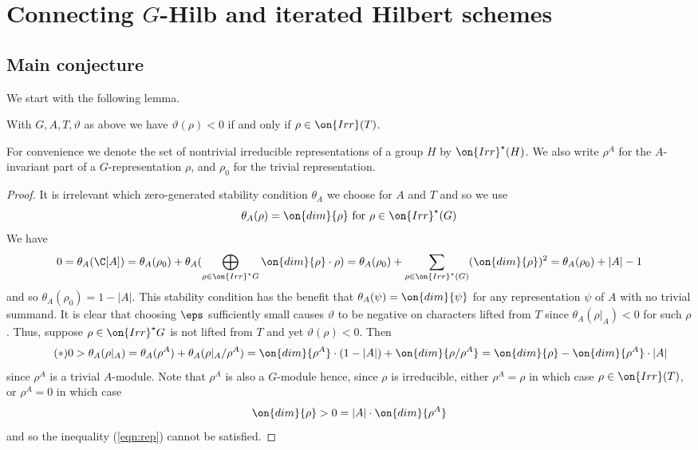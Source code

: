 \documentclass[leqno,11pt,a4paper]{amsart}
\begin{document}
\section{Connecting $G$-Hilb and iterated Hilbert schemes}

\subsection{Main conjecture} \label{sec:conj}

We start with the following lemma.

\begin{lemma} \label{lem:rep} With $G,A,T,\vartheta$ as above we have $\vartheta(\rho)<0$ if and only if $\rho\in\on{Irr}(T)$.
\end{lemma}

For convenience we denote the set of nontrivial irreducible representations of a group $H$ by $\on{Irr}^\star(H)$. We also write $\rho^A$ for the $A$-invariant part of a $G$-representation $\rho$, and $\rho_0$ for the trivial representation.

\begin{proof} It is irrelevant which zero-generated stability condition $\theta_A$ we choose for $A$ and $T$ and so we use
$$\theta_A(\rho)=\on{dim}{\rho}\text{ for $\rho\in\on{Irr}^\star(G)$}$$
We have
$$0=\theta_A(\C[A])=\theta_A(\rho_0)+\theta_A(\bigoplus_{\rho\in\on{Irr}^\star{G}}\on{dim}{\rho}\cdot\rho)=\theta_A(\rho_0)+\sum_{\rho\in\on{Irr}^\star(G)}(\on{dim}{\rho})^2=\theta_A(\rho_0)+|A|-1$$
and so $\theta_A(\rho_0)=1-|A|$. This stability condition has the benefit that $\theta_A(\psi)=\on{dim}{\psi}$ for any representation $\psi$ of $A$ with no trivial summand. It is clear that choosing $\eps$ sufficiently small causes $\vartheta$ to be negative on characters lifted from $T$ since $\theta_A(\rho|_A)<0$ for such $\rho$. Thus, suppose $\rho\in\on{Irr}^\star{G}$ is not lifted from $T$ and yet $\vartheta(\rho)<0$. Then
\begin{equation} \label{eqn:rep} \tag{$*$}
0>\theta_A(\rho|_A)=\theta_A(\rho^A)+\theta_A(\rho|_A/\rho^A)=\on{dim}{\rho^A}\cdot(1-|A|)+\on{dim}{\rho/\rho^A}=\on{dim}{\rho}-\on{dim}{\rho^A}\cdot |A|
\end{equation}
since $\rho^A$ is a trivial $A$-module. Note that $\rho^A$ is also a $G$-module hence, since $\rho$ is irreducible, either $\rho^A=\rho$ in which case $\rho\in\on{Irr}(T)$, or $\rho^A=0$ in which case
$$\on{dim}{\rho}>0=|A|\cdot\on{dim}{\rho^A}$$
and so the inequality (\ref{eqn:rep}) cannot be satisfied.
\end{proof}
\end{document}
